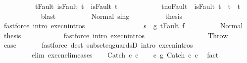 \begin{isabellebody}
\ \ \ \ \ \ \ \ \ \ t{\isacharunderscore}Fault{\isacharcolon}\ {\isachardoublequoteopen}isFault\ t\ {\isasymlongrightarrow}\ isFault\ t{\isacharprime}{\isachardoublequoteclose}\ \ \isanewline
\ \ \ \ \ \ \ \ \ \ t{\isacharunderscore}noFault{\isacharcolon}\ {\isachardoublequoteopen}{\isasymnot}\ isFault\ t{\isacharprime}\ {\isasymlongrightarrow}\ t{\isacharprime}\ {\isacharequal}\ t{\isachardoublequoteclose}\ \isanewline
\ \ \ \ \ \ \ \ \ \ \isamarkupfalse%
\ blast\isanewline
\ \ \ \ \ \ \ \ \isamarkupfalse%
\ Normal\ s{\isacharprime}{\isacharunderscore}in{\isacharunderscore}g{\isacharprime}\isanewline
\ \ \ \ \ \ \ \ \isamarkupfalse%
\ {\isacharquery}thesis\isanewline
\ \ \ \ \ \ \ \ \ \ \isamarkupfalse%
\ {\isacharparenleft}fastforce\ intro{\isacharcolon}\ execn{\isachardot}intros{\isacharparenright}\isanewline
\ \ \ \ \ \ \isamarkupfalse%
\isanewline
\ \ \ \ \ \ \ \ \isamarkupfalse%
\ {\isachardoublequoteopen}s{\isacharprime}\ {\isasymnotin}\ g{\isacharprime}{\isachardoublequoteclose}\ {\isachardoublequoteopen}t{\isacharequal}Fault\ f{\isacharprime}{\isachardoublequoteclose}\isanewline
\ \ \ \ \ \ \ \ \isamarkupfalse%
\ Normal\ \isamarkupfalse%
\ {\isacharquery}thesis\isanewline
\ \ \ \ \ \ \ \ \ \ \isamarkupfalse%
\ {\isacharparenleft}fastforce\ intro{\isacharcolon}\ execn{\isachardot}intros{\isacharparenright}\isanewline
\ \ \ \ \ \ \isamarkupfalse%
\isanewline
\ \ \ \ \isamarkupfalse%
\isanewline
\ \ \isamarkupfalse%
\isanewline
{}\isamarkupfalse%
\isanewline
\ \ \isamarkupfalse%
\ Throw\ \isamarkupfalse%
\ {\isacharquery}case\ \isanewline
\ \ \ \ \isamarkupfalse%
\ {\isacharparenleft}fastforce\ dest{\isacharcolon}\ subseteq{\isacharunderscore}guardsD\ intro{\isacharcolon}\ execn{\isachardot}intros\ \isanewline
\ \ \ \ \ \ \ \ \ elim{\isacharcolon}\ execn{\isacharunderscore}elim{\isacharunderscore}cases{\isacharparenright}\isanewline
{}\isamarkupfalse%
\isanewline
\ \ \isamarkupfalse%
\ {\isacharparenleft}Catch\ c{}{\isacharprime}\ c{}{\isacharprime}{\isacharparenright}\isanewline
\ \ \isamarkupfalse%
\ {\isachardoublequoteopen}c\ {\isasymsubseteq}\isactrlsub g\ Catch\ c{}{\isacharprime}\ c{}{\isacharprime}{\isachardoublequoteclose}\ \isamarkupfalse%
\ fact\isanewline

\end{isabellebody}
